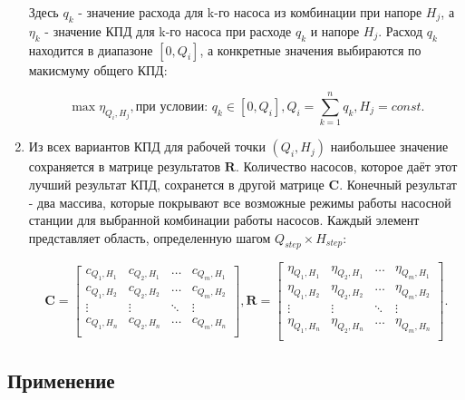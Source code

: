\documentclass[a4paper, 12pt]{article}
\begin{document}
\begin{enumerate}
Здесь $q_k$ - значение расхода для k-го насоса из комбинации при напоре $H_j$, а $\eta_k$ - значение КПД для k-го насоса при расходе $q_k$ и напоре $H_j$. Расход $q_k$ находится в диапазоне $[0, Q_i]$, а конкретные значения выбираются по макисмуму общего КПД:
 
\begin{equation}
	\max {\eta_{Q_i, H_j}}, \text{при условии: } q_k \in [0, Q_i], Q_i = \sum_{k=1}^{n} q_k, H_j = const.
\end{equation}
 
\item
  Из всех вариантов КПД для рабочей точки \((Q_i, H_j)\) наибольшее
  значение сохраняется в матрице результатов \(\mathbf{R}\). Количество
  насосов, которое даёт этот лучший результат КПД, сохранется в другой
  матрице \(\mathbf{C}\). Конечный результат - два массива, которые
  покрывают все возможные режимы работы насосной станции для выбранной
  комбинации работы насосов. Каждый элемент представляет область,
  определенную шагом \(Q_{step} \times H_{step}\):

\begin{equation}
	\mathbf{C} = \left[\begin{matrix}
		c_{Q_1,H_1} & c_{Q_2,H_1} & \dots & c_{Q_m,H_1} \\
		c_{Q_1,H_2} & c_{Q_2,H_2} & \dots & c_{Q_m,H_2} \\ 
		\vdots & \vdots & \ddots & \vdots \\
		c_{Q_1,H_n} & c_{Q_2,H_n} & \dots & c_{Q_m,H_n} \\
	\end{matrix}\right], 
	\mathbf{R} = \left[\begin{matrix}
		\eta_{Q_1,H_1} & \eta_{Q_2,H_1} & \dots & \eta_{Q_m,H_1} \\
		\eta_{Q_1,H_2} & \eta_{Q_2,H_2} & \dots & \eta_{Q_m,H_2} \\ 
		\vdots & \vdots & \ddots & \vdots \\
		\eta_{Q_1,H_n} & \eta_{Q_2,H_n} & \dots & \eta_{Q_m,H_n} \\
	\end{matrix}\right].
\end{equation}

\end{enumerate}


\subsection{Применение}
\end{document}
